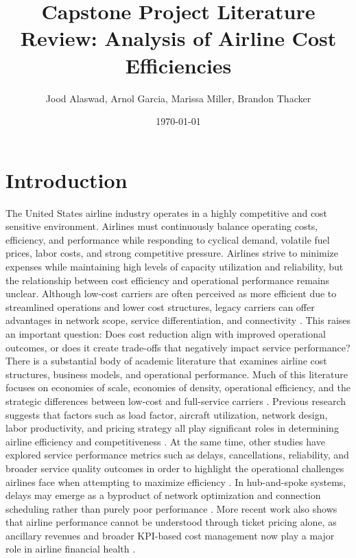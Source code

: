 \documentclass[11pt, letterpaper]{article}
\title{Capstone Project Literature Review: Analysis of Airline Cost Efficiencies}
\author{Jood Alaswad, Arnol Garcia, Marissa Miller, Brandon Thacker}
\date{\today}
\begin{document}
\maketitle

\section{Introduction}
The United States airline industry operates in a highly competitive and cost sensitive environment. Airlines must continuously balance operating costs, efficiency, and performance while responding to cyclical demand, volatile fuel prices, labor costs, and strong competitive pressure. Airlines strive to minimize expenses while maintaining high levels of capacity utilization and reliability, but the relationship between cost efficiency and operational performance remains unclear. Although low-cost carriers are often perceived as more efficient due to streamlined operations and lower cost structures, legacy carriers can offer advantages in network scope, service differentiation, and connectivity \cite{Barbot2008,Fan2016,GillenLall2004}. This raises an important question: Does cost reduction align with improved operational outcomes, or does it create trade-offs that negatively impact service performance?\\
\indent There is a substantial body of academic literature that examines airline cost structures, business models, and operational performance. Much of this literature focuses on economies of scale, economies of density, operational efficiency, and the strategic differences between low-cost and full-service carriers \cite{Banker1993,GillenLall2004,Lim2015}. Previous research suggests that factors such as load factor, aircraft utilization, network design, labor productivity, and pricing strategy all play significant roles in determining airline efficiency and competitiveness \cite{Barbot2008,Caves1984,Santos2018,Zuidberg2014}. At the same time, other studies have explored service performance metrics such as delays, cancellations, reliability, and broader service quality outcomes in order to highlight the operational challenges airlines face when attempting to maximize efficiency \cite{Lee2023,MayerSinai2002,Yalvac2026}. In hub-and-spoke systems, delays may emerge as a byproduct of network optimization and connection scheduling rather than purely poor performance \cite{MayerSinai2002}. More recent work also shows that airline performance cannot be understood through ticket pricing alone, as ancillary revenues and broader KPI-based cost management now play a major role in airline financial health \cite{Moghadasnian2025,Zhou2020}.\\
\end{document}
